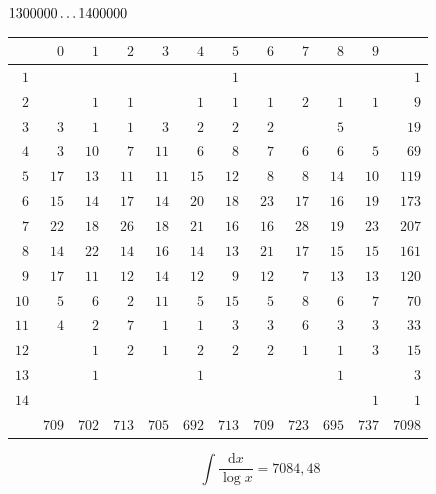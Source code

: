 \par\medskip
\noindent\begin{minipage}{\linewidth}\centering
{}
\(1300000\mathinner{.\,.\,.}1400000\)\par\smallskip
\begingroup\fontsize{10.5}{11.5}\selectfont\setlength{\tabcolsep}{3.5pt}\renewcommand{\arraystretch}{1}
\begin{tabular}{r|rrrrrrrrrr|r}\hline
 & $0$ & $1$ & $2$ & $3$ & $4$ & $5$ & $6$ & $7$ & $8$ & $9$ &  \\ \hline
$1$ &  &  &  &  &  & $1$ &  &  &  &  & $1$ \\
$2$ &  & $1$ & $1$ &  & $1$ & $1$ & $1$ & $2$ & $1$ & $1$ & $9$ \\
$3$ & $3$ & $1$ & $1$ & $3$ & $2$ & $2$ & $2$ &  & $5$ &  & $19$ \\
$4$ & $3$ & $10$ & $7$ & $11$ & $6$ & $8$ & $7$ & $6$ & $6$ & $5$ & $69$ \\
$5$ & $17$ & $13$ & $11$ & $11$ & $15$ & $12$ & $8$ & $8$ & $14$ & $10$ & $119$ \\
$6$ & $15$ & $14$ & $17$ & $14$ & $20$ & $18$ & $23$ & $17$ & $16$ & $19$ & $173$ \\
$7$ & $22$ & $18$ & $26$ & $18$ & $21$ & $16$ & $16$ & $28$ & $19$ & $23$ & $207$ \\
$8$ & $14$ & $22$ & $14$ & $16$ & $14$ & $13$ & $21$ & $17$ & $15$ & $15$ & $161$ \\
$9$ & $17$ & $11$ & $12$ & $14$ & $12$ & $9$ & $12$ & $7$ & $13$ & $13$ & $120$ \\
$10$ & $5$ & $6$ & $2$ & $11$ & $5$ & $15$ & $5$ & $8$ & $6$ & $7$ & $70$ \\
$11$ & $4$ & $2$ & $7$ & $1$ & $1$ & $3$ & $3$ & $6$ & $3$ & $3$ & $33$ \\
$12$ &  & $1$ & $2$ & $1$ & $2$ & $2$ & $2$ & $1$ & $1$ & $3$ & $15$ \\
$13$ &  & $1$ &  &  & $1$ &  &  &  & $1$ &  & $3$ \\
$14$ &  &  &  &  &  &  &  &  &  & $1$ & $1$ \\
\hline
 & $709$ & $702$ & $713$ & $705$ & $692$ & $713$ & $709$ & $723$ & $695$ & $737$ & $7098$ \\ \hline
\end{tabular}\par\endgroup
\setlength{\abovedisplayskip}{6pt}\setlength{\belowdisplayskip}{4pt}
\[\int\frac{\mathrm{d}x}{\log x}=7084{,}48\]
\end{minipage}
